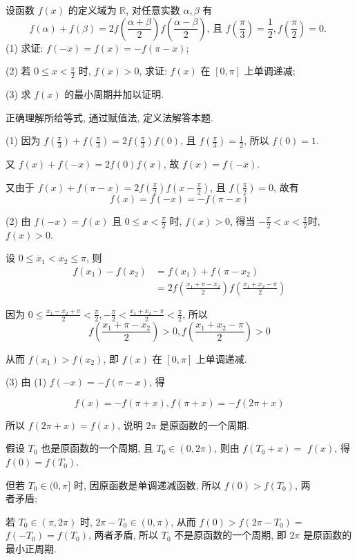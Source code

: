 \begin{example}
	设函数 $f(x)$ 的定义域为 $\mathbb{R}$, 对任意实数 $\alpha ,  \beta$ 有
	$$
		f(\alpha)+f(\beta)=2 f\left(\frac{\alpha+\beta}{2}\right) f\left(\frac{\alpha-\beta}{2}\right) \text {, 且 } f\left(\frac{\pi}{3}\right)=\frac{1}{2}, f\left(\frac{\pi}{2}\right)=0 \text {. }
	$$
	(1) 求证: $f(-x)=f(x)=-f(\pi-x)$;

	(2) 若 $0 \leqslant x<\frac{\pi}{2}$ 时, $f(x)>0$, 求证: $f(x)$ 在 $[0, \pi]$ 上单调递减;

	(3) 求 $f(x)$ 的最小周期并加以证明.
\end{example}
\begin{analysis}
	正确理解所给等式, 通过赋值法, 定义法解答本题.
\end{analysis}
\begin{solution}
	(1) 因为 $f\left(\frac{\pi}{3}\right)+f\left(\frac{\pi}{3}\right)=2 f\left(\frac{\pi}{3}\right) f(0)$, 且 $f\left(\frac{\pi}{3}\right)=\frac{1}{2}$, 所以 $f(0)=1$.

	又 $f(x)+f(-x)=2 f(0) f(x)$, 故 $f(x)=f(-x)$.

	又由于 $f(x)+f(\pi-x)=2 f\left(\frac{\pi}{2}\right) f\left(x-\frac{\pi}{2}\right)$, 且 $f\left(\frac{\pi}{2}\right)=0$, 故有
	$$
		f(x)=f(-x)=-f(\pi-x)
	$$

	(2) 由 $f(-x)=f(x)$ 且 $0 \leqslant x<\frac{\pi}{2}$ 时, $f(x)>0$, 得当 $-\frac{\pi}{2}<x<\frac{\pi}{2}$时, $f(x)>0$.

	设 $0 \leqslant x_{1}<x_{2} \leqslant \pi$, 则
	$$
		\begin{aligned}
			f\left(x_{1}\right)-f\left(x_{2}\right) & =f\left(x_{1}\right)+f\left(\pi-x_{2}\right)                                       \\
			                                        & =2 f\left(\frac{x_{1}+\pi-x_{2}}{2}\right) f\left(\frac{x_{1}+x_{2}-\pi}{2}\right)
		\end{aligned}
	$$

	因为 $0 \leqslant \frac{x_{1}-x_{2}+\pi}{2}<\frac{\pi}{2},-\frac{\pi}{2}<\frac{x_{1}+x_{2}-\pi}{2}<\frac{\pi}{2}$, 所以
	$$
		f\left(\frac{x_{1}+\pi-x_{2}}{2}\right)>0, f\left(\frac{x_{1}+x_{2}-\pi}{2}\right)>0
	$$

	从而 $f\left(x_{1}\right)>f\left(x_{2}\right)$, 即 $f(x)$ 在 $[0, \pi]$ 上单调递减.

	(3) 由 (1) $f(-x)=-f(\pi-x)$, 得

	$$
		f(x)=-f(\pi+x), f(\pi+x)=-f(2 \pi+x)
	$$

	所以 $f(2 \pi+x)=f(x)$, 说明 $2 \pi$ 是原函数的一个周期.

	假设 $T_{0}$ 也是原函数的一个周期, 且 $T_{0} \in(0,2 \pi)$, 则由 $f\left(T_{0}+x\right)=$ $f(x)$, 得 $f(0)=f\left(T_{0}\right)$.

	但若 $T_{0} \in(0, \pi]$ 时, 因原函数是单调递减函数, 所以 $f(0)>f\left(T_{0}\right)$, 两\\
	者矛盾;

	若 $T_{0} \in(\pi, 2 \pi)$ 时, $2 \pi-T_{0} \in(0, \pi)$, 从而 $f(0)>f\left(2 \pi-T_{0}\right)=$ $f\left(-T_{0}\right)=f\left(T_{0}\right)$, 两者矛盾, 所以 $T_{0}$ 不是原函数的一个周期, 即 $2 \pi$ 是原函数的最小正周期.
\end{solution}
